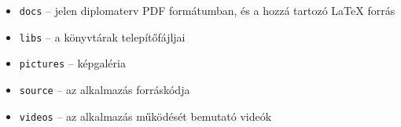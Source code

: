 \begin{itemize}
  \item \texttt{docs} -- jelen diplomaterv PDF formátumban, és a hozzá tartozó \LaTeX{} forrás
  \item \texttt{libs} -- a könyvtárak telepítőfájljai
  \item \texttt{pictures} -- képgaléria
  \item \texttt{source} -- az alkalmazás forráskódja
  \item \texttt{videos} -- az alkalmazás működését bemutató videók
\end{itemize}
